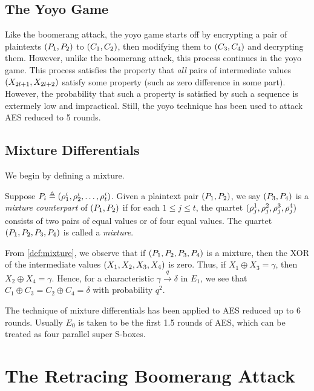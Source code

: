 \documentclass[twoside]{article}
\begin{document}
\subsection{The Yoyo Game}

Like the boomerang attack, the yoyo game starts off by encrypting a pair of
plaintexts \((P_1, P_2)\) to \((C_1, C_2)\), then modifying them to
\((C_3, C_4)\) and decrypting them. However, unlike the boomerang attack,
this process continues in the yoyo game. This process satisfies the property
that \emph{all} pairs of intermediate values \((X_{2l + 1}, X_{2l + 2})\)
satisfy some property (such as zero difference in some part). However, the
probability that such a property is satisfied by such a sequence is extermely
low and impractical. Still, the yoyo technique has been used to attack AES
reduced to 5 rounds.

\subsection{Mixture Differentials}

We begin by defining a mixture.

\begin{definition}[Mixture]
    \label{def:mixture}
    Suppose \(P_i \triangleq (\rho_1^i, \rho_2^i, \ldots, \rho_t^i)\).
    Given a plaintext pair \((P_1, P_2)\), we say \((P_3, P_4)\) is a
    \emph{mixture counterpart} of \((P_1, P_2)\) if for each \(1 \le j \le t\),
    the quartet \((\rho_j^1, \rho_j^2, \rho_j^3, \rho_j^4)\) consists of
    two pairs of equal values or of four equal values. The quartet \((P_1,
    P_2, P_3, P_4)\) is called a \emph{mixture}.
\end{definition}

From \autoref{def:mixture}, we observe that if \((P_1, P_2, P_3, P_4)\) is
a mixture, then the XOR of the intermediate values \((X_1, X_2, X_3, X_4)\)
is zero. Thus, if \(X_1 \oplus X_3 = \gamma\), then \(X_2 \oplus X_4 = \gamma\).
Hence, for a characteristic \(\gamma \xrightarrow{q} \delta\) in \(E_1\), we see
that \(C_1 \oplus C_3 = C_2 \oplus C_4 = \delta\) with probability \(q^2\).

The technique of mixture differentials has been applied to AES reduced up to 6
rounds. Usually \(E_0\) is taken to be the first 1.5 rounds of AES, which can be
treated as four parallel super S-boxes.

\section{The Retracing Boomerang Attack}
\end{document}
